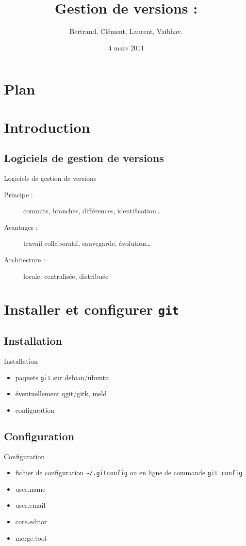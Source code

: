 \documentclass{beamer}
\title[ROSE]{Gestion de versions : \git}
\author{Bertrand, Clément, Laurent, Vaibhav.}
\institute{Télécom ParisTech}
\date{4 mars 2011}
\newcommand{\git}{\texttt{git}\xspace}
\begin{document}
\begin{frame}
  \titlepage
\end{frame}

\section*{Plan}

\section{Introduction}

\subsection*{Logiciels de gestion de versions}
\begin{frame}{Logiciels de gestion de versions}
  \begin{description}
  \item[Principe :] commits, branches, différences, identification\dots
  \item[Avantages :] travail collaboratif, sauvegarde, évolution\dots
  \item[Architecture :] locale, centralisée, distribuée
  \end{description}
\end{frame}

\section{Installer et configurer \git}

\subsection*{Installation}
\begin{frame}{Installation}
  \begin{itemize}
  \item paquets \texttt{git} sur debian/ubuntu
  \item éventuellement qgit/gitk, meld
  \item configuration
  \end{itemize}
\end{frame}

\subsection*{Configuration}
\begin{frame}[containsverbatim]{Configuration}
  \begin{itemize}
  \item fichier de configuration \lstinline|~/.gitconfig| ou en ligne de commande \lstinline|git config|
  \item user.name
  \item user.email
  \item core.editor
  \item merge.tool
  \end{itemize}
\end{frame}
\end{document}

